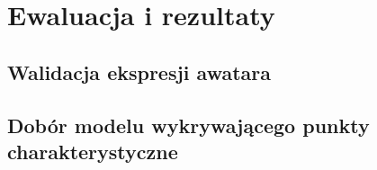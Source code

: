 \chapter{Ewaluacja i rezultaty}
\label{cha:ewaluacjaIRezultaty}
\section{Walidacja ekspresji awatara}
\section{Dobór modelu wykrywającego punkty charakterystyczne}